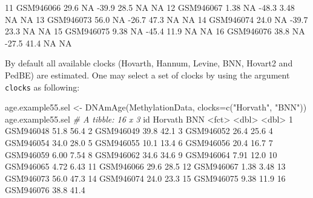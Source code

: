 \documentclass[]{article}
\newcommand{\hlnum}[1]{\textcolor[rgb]{0.816,0.125,0.439}{#1}}%
\newcommand{\hlstr}[1]{\textcolor[rgb]{0.251,0.627,0.251}{#1}}%
\newcommand{\hlcom}[1]{\textcolor[rgb]{0.502,0.502,0.502}{\textit{#1}}}%
\newcommand{\hlopt}[1]{\textcolor[rgb]{0,0,0}{#1}}%
\newcommand{\hlstd}[1]{\textcolor[rgb]{0.251,0.251,0.251}{#1}}%
\newcommand{\hlkwc}[1]{\textcolor[rgb]{0.251,0.251,0.251}{#1}}%
\newcommand{\hlkwd}[1]{\textcolor[rgb]{0.878,0.439,0.125}{#1}}%
\newenvironment{Shaded}{\begin{myshaded}}{\end{myshaded}}
\newcommand{\KeywordTok}[1]{\hlkwd{#1}}
\newcommand{\DataTypeTok}[1]{\hlkwc{#1}}
\newcommand{\DecValTok}[1]{\hlnum{#1}}
\newcommand{\FloatTok}[1]{\hlnum{#1}}
\newcommand{\StringTok}[1]{\hlstr{#1}}
\newcommand{\CommentTok}[1]{\hlcom{#1}}
\newcommand{\OtherTok}[1]{{#1}}
\newcommand{\OperatorTok}[1]{\hlopt{#1}}
\newcommand{\ErrorTok}[1]{\textcolor{errorcolor}{#1}}
\newcommand{\NormalTok}[1]{\hlstd{#1}}
\begin{document}
\begin{Shaded}
\begin{Highlighting}[]
  \DecValTok{11}\NormalTok{ GSM946066   }\FloatTok{29.6}  \OtherTok{NA}      \FloatTok{-39.9} \FloatTok{28.5}  \OtherTok{NA}          \OtherTok{NA}   
  \DecValTok{12}\NormalTok{ GSM946067    }\FloatTok{1.38} \OtherTok{NA}      \FloatTok{-48.3}  \FloatTok{3.48} \OtherTok{NA}          \OtherTok{NA}   
  \DecValTok{13}\NormalTok{ GSM946073   }\FloatTok{56.0}  \OtherTok{NA}      \FloatTok{-26.7} \FloatTok{47.3}  \OtherTok{NA}          \OtherTok{NA}   
  \DecValTok{14}\NormalTok{ GSM946074   }\FloatTok{24.0}  \OtherTok{NA}      \FloatTok{-39.7} \FloatTok{23.3}  \OtherTok{NA}          \OtherTok{NA}   
  \DecValTok{15}\NormalTok{ GSM946075    }\FloatTok{9.38} \OtherTok{NA}      \FloatTok{-45.4} \FloatTok{11.9}  \OtherTok{NA}          \OtherTok{NA}   
  \DecValTok{16}\NormalTok{ GSM946076   }\FloatTok{38.8}  \OtherTok{NA}      \FloatTok{-27.5} \FloatTok{41.4}  \OtherTok{NA}          \OtherTok{NA}
\end{Highlighting}
\end{Shaded}

By default all available clocks (Hovarth, Hannum, Levine, BNN, Hovart2 and PedBE) are estimated. One may select a set of clocks by using the argument \texttt{clocks} as following:

\begin{Shaded}
\begin{Highlighting}[]
\NormalTok{age.example55.sel <-}\StringTok{ }\KeywordTok{DNAmAge}\NormalTok{(MethylationData, }
                             \DataTypeTok{clocks=}\KeywordTok{c}\NormalTok{(}\StringTok{"Horvath"}\NormalTok{, }\StringTok{"BNN"}\NormalTok{))}
\NormalTok{age.example55.sel}
  \CommentTok{# A tibble: 16 x 3}
\NormalTok{     id        Horvath   BNN}
     \OperatorTok{<}\NormalTok{fct}\OperatorTok{>}\StringTok{       }\ErrorTok{<}\NormalTok{dbl}\OperatorTok{>}\StringTok{ }\ErrorTok{<}\NormalTok{dbl}\OperatorTok{>}
\StringTok{   }\DecValTok{1}\NormalTok{ GSM946048   }\FloatTok{51.8}  \FloatTok{56.4} 
   \DecValTok{2}\NormalTok{ GSM946049   }\FloatTok{39.8}  \FloatTok{42.1} 
   \DecValTok{3}\NormalTok{ GSM946052   }\FloatTok{26.4}  \FloatTok{25.6} 
   \DecValTok{4}\NormalTok{ GSM946054   }\FloatTok{34.0}  \FloatTok{28.0} 
   \DecValTok{5}\NormalTok{ GSM946055   }\FloatTok{10.1}  \FloatTok{13.4} 
   \DecValTok{6}\NormalTok{ GSM946056   }\FloatTok{20.4}  \FloatTok{16.7} 
   \DecValTok{7}\NormalTok{ GSM946059    }\FloatTok{6.00}  \FloatTok{7.54}
   \DecValTok{8}\NormalTok{ GSM946062   }\FloatTok{34.6}  \FloatTok{34.6} 
   \DecValTok{9}\NormalTok{ GSM946064    }\FloatTok{7.91} \FloatTok{12.0} 
  \DecValTok{10}\NormalTok{ GSM946065    }\FloatTok{4.72}  \FloatTok{6.43}
  \DecValTok{11}\NormalTok{ GSM946066   }\FloatTok{29.6}  \FloatTok{28.5} 
  \DecValTok{12}\NormalTok{ GSM946067    }\FloatTok{1.38}  \FloatTok{3.48}
  \DecValTok{13}\NormalTok{ GSM946073   }\FloatTok{56.0}  \FloatTok{47.3} 
  \DecValTok{14}\NormalTok{ GSM946074   }\FloatTok{24.0}  \FloatTok{23.3} 
  \DecValTok{15}\NormalTok{ GSM946075    }\FloatTok{9.38} \FloatTok{11.9} 
  \DecValTok{16}\NormalTok{ GSM946076   }\FloatTok{38.8}  \FloatTok{41.4}
\end{Highlighting}
\end{Shaded}
\end{document}
